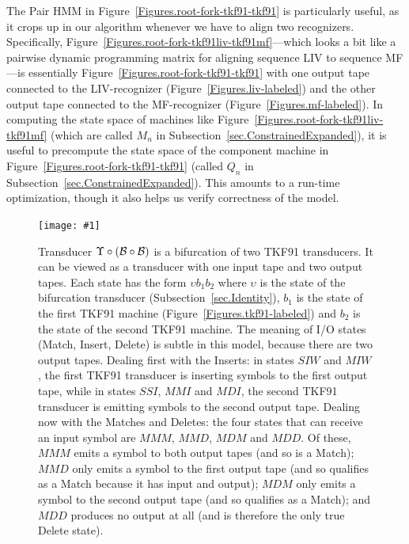 \documentclass{article}
\newcommand{\secref}[1]{Subsection~\ref{sec.#1}}
\newcommand{\figref}[1]{Figure~\ref{Figures.#1}}
\newcommand{\figlabel}[1]{\label{Figures.#1}}
\newcommand{\easyfig}[4]{
\begin{figure}
\texttt{[image: \#1]}
\caption{ \figlabel{#3} #4}
\end{figure}}
\newcommand{\widepdffig}[2]{\easyfig{#1-fig.pdf}{width=\textwidth}{#1}{#2}}
\newcommand\tkf{{\cal B}}
\newcommand\fork{\circ}
\newcommand\idfork{\Upsilon}
\begin{document}
The Pair HMM in \figref{root-fork-tkf91-tkf91} is particularly useful, as it crops up in our algorithm
whenever we have to align two recognizers. Specifically, 
\figref{root-fork-tkf91liv-tkf91mf}---which looks a bit like a pairwise dynamic programming matrix
for aligning sequence LIV to sequence MF---is essentially
\figref{root-fork-tkf91-tkf91} with one output tape connected to the LIV-recognizer (\figref{liv-labeled})
and the other output tape connected to the MF-recognizer (\figref{mf-labeled}).
In computing the state space of machines like \figref{root-fork-tkf91liv-tkf91mf}
(which are called $M_n$ in \secref{ConstrainedExpanded}),
it is useful to precompute the state space of the component machine in \figref{root-fork-tkf91-tkf91}
(called $Q_n$ in \secref{ConstrainedExpanded}).
This amounts to a run-time optimization, though it also helps us verify correctness of the model.

\widepdffig{fork-tkf91-tkf91}{
Transducer $\idfork \circ (\tkf \fork \tkf)$ is a bifurcation of two TKF91 transducers.
It can be viewed as a transducer with one input tape and two output tapes.
Each state has the form $\upsilon b_1 b_2$ where
 $\upsilon$ is the state of the bifurcation transducer (\secref{Identity}),
 $b_1$ is the state of the first TKF91 machine (\figref{tkf91-labeled}) and $b_2$ is the state of the second TKF91 machine.
The meaning of I/O states (Match, Insert, Delete) is subtle in this model, because there are two output tapes.
Dealing first with the Inserts:
in states $SIW$ and $MIW$, the first TKF91 transducer is inserting symbols to the first output tape,
while in states $SSI$, $MMI$ and $MDI$, the second TKF91 transducer is emitting symbols to the second output tape.
Dealing now with the Matches and Deletes:
the four states that can receive an input symbol
are $MMM$, $MMD$, $MDM$ and $MDD$.
Of these,
$MMM$ emits a symbol to both output tapes (and so is a Match);
$MMD$ only emits a symbol to the first output tape (and so qualifies as a Match because it has input and output);
$MDM$ only emits a symbol to the second output tape (and so qualifies as a Match);
and $MDD$ produces no output at all (and is therefore the only true Delete state).
}
\end{document}

